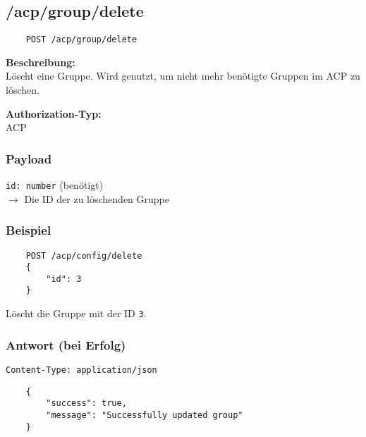 \subsection{/acp/group/delete}

\begin{lstlisting}
    POST /acp/group/delete
\end{lstlisting}

\textbf{Beschreibung:} \\
Löscht eine Gruppe. Wird genutzt, um nicht mehr benötigte Gruppen im ACP zu löschen.

\textbf{Authorization-Typ:} \\
ACP

\subsubsection{Payload}

\lstinline{id: number} (benötigt) \\
$\rightarrow$ Die ID der zu löschenden Gruppe

\subsubsection{Beispiel}

\begin{lstlisting}
    POST /acp/config/delete
    {
        "id": 3
    }
\end{lstlisting}

Löscht die Gruppe mit der ID \lstinline{3}.

\subsubsection{Antwort (bei Erfolg)}

\lstinline{Content-Type: application/json}
\begin{lstlisting}
    {
        "success": true, 
        "message": "Successfully updated group"
    }
\end{lstlisting}